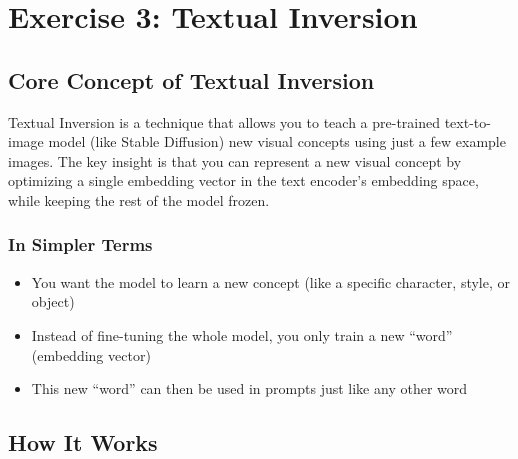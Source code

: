 \chapter{\normalsize Exercise 3: Textual Inversion}
\section*{Core Concept of Textual Inversion}

Textual Inversion is a technique that allows you to teach a pre-trained text-to-image model (like Stable Diffusion) new visual concepts using just a few example images. The key insight is that you can represent a new visual concept by optimizing a single embedding vector in the text encoder's embedding space, while keeping the rest of the model frozen.

\subsection*{In Simpler Terms}
\begin{itemize}
  \item You want the model to learn a new concept (like a specific character, style, or object)
  \item Instead of fine-tuning the whole model, you only train a new ``word'' (embedding vector)
  \item This new ``word'' can then be used in prompts just like any other word
\end{itemize}

\section*{How It Works}

